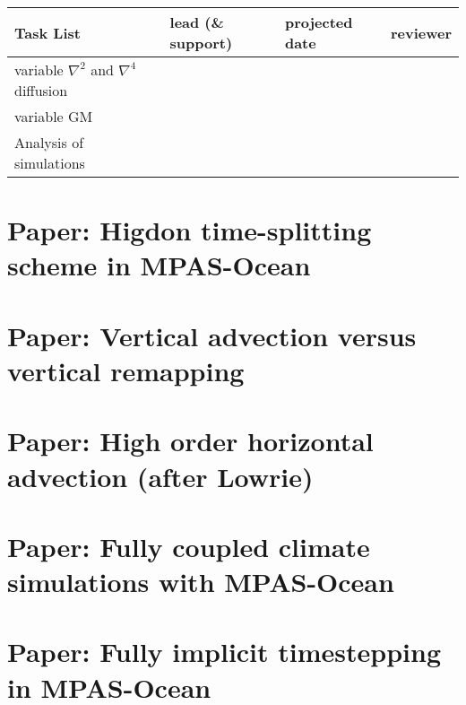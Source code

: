 \begin{tabular}{| l || l | l | l |}
\hline		
{\bf Task List} \hspace{1.8in} & {\bf lead (\& support)} \hspace{0.1in} & {\bf projected date} & {\bf reviewer } \\
\hline		
variable $\nabla^2$ and $\nabla^4$ diffusion &  &  & \\ \hline
variable GM &  &  & \\ \hline
Analysis of simulations &  &  & \\ \hline
\end{tabular}

\section{Paper: Higdon time-splitting scheme in MPAS-Ocean}

\section{Paper: Vertical advection versus vertical remapping}


\section{Paper: High order horizontal advection (after Lowrie)}

\section{Paper: Fully coupled climate simulations with MPAS-Ocean}


\section{Paper: Fully implicit timestepping in MPAS-Ocean}
